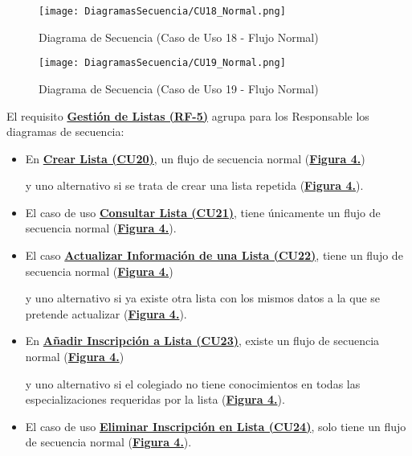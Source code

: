 \begin{landscape}
  \label{fig:Secuencia_CU18_Normal}
  \vspace*{\fill}
  \begin{figure}[!htbp]
    \centering
    \texttt{[image: DiagramasSecuencia/CU18\_Normal.png]}
    \caption{Diagrama de Secuencia (Caso de Uso 18 - Flujo Normal)}
  \end{figure}
  \vfill
\end{landscape}
\FloatBarrier

\begin{landscape}
  \label{fig:Secuencia_CU19_Normal}
  \vspace*{\fill}
  \begin{figure}[!htbp]
    \centering
    \texttt{[image: DiagramasSecuencia/CU19\_Normal.png]}
    \caption{Diagrama de Secuencia (Caso de Uso 19 - Flujo Normal)}
  \end{figure}
  \vfill
\end{landscape}
\FloatBarrier


El requisito \textbf{\hyperref[tab:rfGestLst]{Gestión de Listas (RF-5)}} agrupa para los Responsable los diagramas de secuencia:
\begin{itemize}
  \item \addtocounter{figura_cap4}{1} En \textbf{\hyperref[tab:curCrearLista]{Crear Lista (CU20)}}, un flujo de secuencia normal (\textbf{\hyperref[fig:Secuencia_CU20_Normal]{Figura 4.}}) \addtocounter{figura_cap4}{1} y uno alternativo si se trata de crear una lista repetida (\textbf{\hyperref[fig:Secuencia_CU20_Alt1]{Figura 4.}}).
  \item \addtocounter{figura_cap4}{1} El caso de uso \textbf{\hyperref[tab:curConsultarLista]{Consultar Lista (CU21)}}, tiene únicamente un flujo de secuencia normal (\textbf{\hyperref[fig:Secuencia_CU21_Normal]{Figura 4.}}).
  \item \addtocounter{figura_cap4}{1} El caso \textbf{\hyperref[tab:curActualizarLista]{Actualizar Información de una Lista (CU22)}}, tiene un flujo de secuencia normal (\textbf{\hyperref[fig:Secuencia_CU22_Normal]{Figura 4.}}) \addtocounter{figura_cap4}{1} y uno alternativo si ya existe otra lista con los mismos datos a la que se pretende actualizar (\textbf{\hyperref[fig:Secuencia_CU22_Alt1]{Figura 4.}}).
  \item \addtocounter{figura_cap4}{1} En \textbf{\hyperref[tab:curCrearInscrLst]{Añadir Inscripción a Lista (CU23)}}, existe un flujo de secuencia normal (\textbf{\hyperref[fig:Secuencia_CU23_Normal]{Figura 4.}}) \addtocounter{figura_cap4}{1} y uno alternativo si el colegiado no tiene conocimientos en todas las especializaciones requeridas por la lista (\textbf{\hyperref[fig:Secuencia_CU23_Alt1]{Figura 4.}}).
  \item \addtocounter{figura_cap4}{1} El caso de uso \textbf{\hyperref[tab:curEliminarInscrLst]{Eliminar Inscripción en Lista (CU24)}}, solo tiene un flujo de secuencia normal (\textbf{\hyperref[fig:Secuencia_CU24_Normal]{Figura 4.}}).
\end{itemize}

